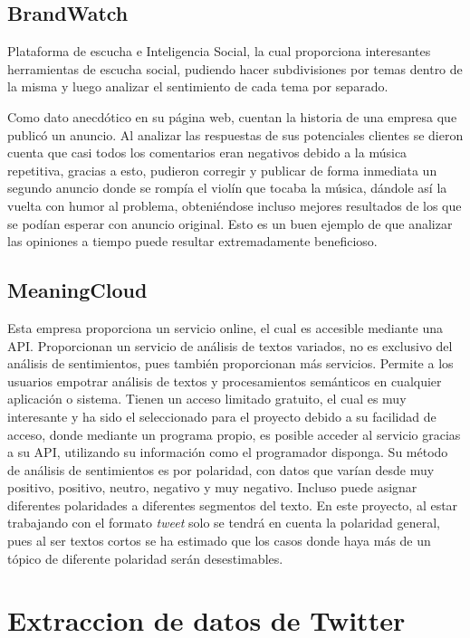 \subsection{BrandWatch}
Plataforma de escucha e Inteligencia Social, la cual proporciona interesantes herramientas de escucha social, pudiendo hacer subdivisiones por temas dentro de la misma y luego analizar el sentimiento de cada tema por separado. 

Como dato anecdótico en su página web, cuentan la historia de una empresa que publicó un anuncio. Al analizar las respuestas de sus potenciales clientes se dieron cuenta que casi todos los comentarios eran negativos debido a la música repetitiva, gracias a esto, pudieron corregir y publicar de forma inmediata un segundo anuncio donde se rompía el violín que tocaba la música, dándole así la vuelta con humor al problema, obteniéndose incluso mejores resultados de los que se podían esperar con anuncio original. Esto es un buen ejemplo de que analizar las opiniones a tiempo puede resultar extremadamente beneficioso.

\subsection{MeaningCloud}
Esta empresa proporciona un servicio online, el cual es accesible mediante una API. Proporcionan un servicio de análisis de textos variados, no es exclusivo del análisis de sentimientos, pues también proporcionan más servicios. Permite a los usuarios empotrar análisis de textos y procesamientos semánticos en cualquier aplicación o sistema. Tienen un acceso limitado gratuito, el cual es muy interesante y ha sido el seleccionado para el proyecto debido a su facilidad de acceso, donde mediante un programa propio, es posible acceder al servicio gracias a su API, utilizando su información como el programador disponga. Su método de análisis de sentimientos es por polaridad, con datos que varían desde muy positivo, positivo, neutro, negativo y muy negativo. Incluso puede asignar diferentes polaridades a diferentes segmentos del texto. En este proyecto, al estar trabajando con el formato \textit{tweet} solo se tendrá en cuenta la polaridad general, pues al ser textos cortos se ha estimado que los casos donde haya más de un tópico de diferente polaridad serán desestimables. 


\section{Extraccion de datos de Twitter}

